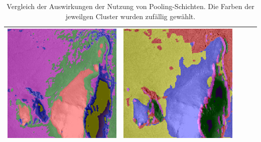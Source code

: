 \begin{table}[h!]
\begin{tabularx}{\textwidth}{>{\centering}m{}
			>{\centering}m{}
			>{\centering}m{}
			>{\centering}m{}
			>{\centering\arraybackslash}m{}}
		\includegraphics[width=0.9\linewidth]{images/gen/pooling_layers/p03_04.png_2.png} &
		\includegraphics[width=0.9\linewidth]{images/gen/pooling_layers/p03_04.png_4.png} \\
		\bottomrule
	\end{tabularx}
	\caption{Vergleich der Auswirkungen der Nutzung von Pooling-Schichten. Die Farben der jeweilgen Cluster wurden zufällig gewählt.}
	\label{tab:maxpool_comparision}
\end{table}

